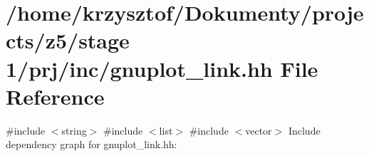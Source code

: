 \hypertarget{gnuplot__link_8hh}{}\section{/home/krzysztof/\+Dokumenty/projects/z5/stage 1/prj/inc/gnuplot\+\_\+link.hh File Reference}
\label{gnuplot__link_8hh}
{\ttfamily \#include $<$string$>$}\newline
{\ttfamily \#include $<$list$>$}\newline
{\ttfamily \#include $<$vector$>$}\newline
Include dependency graph for gnuplot\+\_\+link.\+hh\+:

